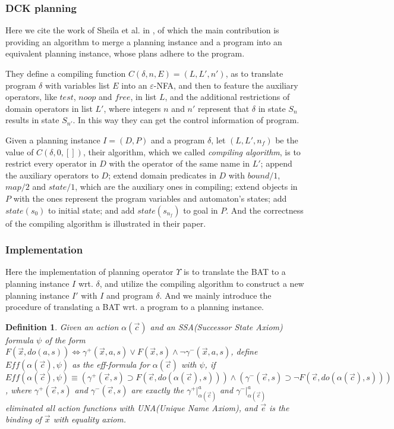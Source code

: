 \documentclass[letterpaper]{article}
\newtheorem{DEFINITION}[theorem]{Definition}
\newenvironment{definition}{\begin{DEFINITION} \rm }
                            {\end{DEFINITION}}
\begin{document}
\subsubsection{DCK planning}
Here we cite the work of Sheila et al. in \cite{BFM07}, of which the main contribution is providing an algorithm to merge a planning instance and a program into an equivalent planning instance, whose plans adhere to the program.

They define a compiling function $C(\delta, n , E) = (L, L', n')$, as to translate program $\delta$ with variables list $E$ into an $\varepsilon$-NFA, and then to feature the auxiliary operators, like $test$, $noop$ and $free$, in list $L$, and the additional restrictions of domain operators in list $L'$, where integers $n$ and $n'$ represent that $\delta$ in state $S_n$ results in state $S_{n'}$. In this way they can get the control information of program.

Given a planning instance $I=(D,P)$ and a program $\delta$, let $(L, L', n_f)$ be the value of $C(\delta, 0 , [])$, their algorithm, which we called \emph{compiling algorithm}, is to restrict every operator in $D$ with the operator of the same name in $L'$; append the auxiliary operators to $D$; extend domain predicates in $D$ with $bound/1$, $map/2$ and $state/1$, which are the auxiliary ones in compiling; extend objects in $P$ with the ones represent the program variables and automaton's states; add $state(s_0)$ to initial state; and add $state(s_{n_f})$ to goal in $P$. And the correctness of the compiling algorithm is illustrated in their paper.

\subsubsection{Implementation}
Here the implementation of planning operator $\Upsilon$ is to translate the BAT to a planning instance $I$ wrt. $\delta$, and utilize the compiling algorithm to construct a new planning instance $I'$ with $I$ and program $\delta$. And we mainly introduce the procedure of translating a BAT wrt. a program to a planning instance.

\begin{definition}\label{ssa2eff}
Given an action $\alpha(\vec{c})$ and an SSA(Successor State Axiom) formula $\psi$ of the form $F(\vec{x}, do(a, s)) \Leftrightarrow \gamma^+(\vec{x}, a, s) \vee F(\vec{x}, s) \wedge \neg\gamma^-(\vec{x}, a, s)$, define $Eff(\alpha(\vec{c}), \psi)$ as the \emph{eff-formula} for $\alpha(\vec{c})$ with $\psi$, if
$Eff(\alpha(\vec{c}), \psi) \equiv (\gamma^+(\vec{e}, s) \supset F(\vec{e}, do(\alpha(\vec{c}), s))) \wedge (\gamma^-(\vec{e}, s) \supset \neg F(\vec{e}, do(\alpha(\vec{c}), s)))$,
where $\gamma^+(\vec{e}, s)$ and $\gamma^-(\vec{e}, s)$ are exactly the $\gamma^+|_{\alpha(\vec{c})}^a$ and $\gamma^-|_{\alpha(\vec{c})}^a$ eliminated all action functions with UNA(Unique Name Axiom),
and $\vec{e}$ is the binding of $\vec{x}$ with equality axiom.
\end{definition}
\end{document}
